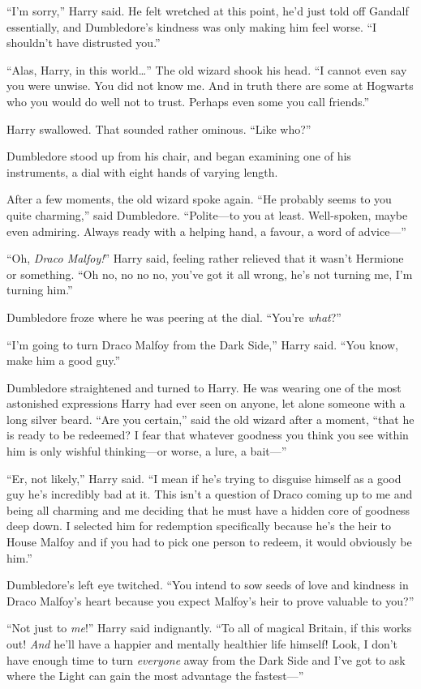 “I’m sorry,” Harry said. He felt wretched at this point, he’d just told off Gandalf essentially, and Dumbledore’s kindness was only making him feel worse.
“I shouldn’t have distrusted you.”

“Alas, Harry, in this world…” The old wizard shook his head.
“I cannot even say you were unwise. You did not know me. And in truth there are some at Hogwarts who you would do well not to trust. Perhaps even some you call friends.”

Harry swallowed. That sounded rather ominous.
“Like who?”

Dumbledore stood up from his chair, and began examining one of his instruments, a dial with eight hands of varying length.

After a few moments, the old wizard spoke again.
“He probably seems to you quite charming,” said Dumbledore.
“Polite—to you at least. Well-spoken, maybe even admiring. Always ready with a helping hand, a favour, a word of advice—”

“Oh, \emph{Draco Malfoy!}” Harry said, feeling rather relieved that it wasn’t Hermione or something.
“Oh no, no no no, you’ve got it all wrong, he’s not turning me, I’m turning him.”

Dumbledore froze where he was peering at the dial.
“You’re \emph{what}?”

“I’m going to turn Draco Malfoy from the Dark Side,” Harry said.
“You know, make him a good guy.”

Dumbledore straightened and turned to Harry. He was wearing one of the most astonished expressions Harry had ever seen on anyone, let alone someone with a long silver beard.
“Are you certain,” said the old wizard after a moment, “that he is ready to be redeemed? I fear that whatever goodness you think you see within him is only wishful thinking—or worse, a lure, a bait—”

“Er, not likely,” Harry said.
“I mean if he’s trying to disguise himself as a good guy he’s incredibly bad at it. This isn’t a question of Draco coming up to me and being all charming and me deciding that he must have a hidden core of goodness deep down. I selected him for redemption specifically because he’s the heir to House Malfoy and if you had to pick one person to redeem, it would obviously be him.”

Dumbledore’s left eye twitched.
“You intend to sow seeds of love and kindness in Draco Malfoy’s heart because you expect Malfoy’s heir to prove valuable to you?”

“Not just to \emph{me}!” Harry said indignantly.
“To all of magical Britain, if this works out! \emph{And} he’ll have a happier and mentally healthier life himself! Look, I don’t have enough time to turn \emph{everyone} away from the Dark Side and I’ve got to ask where the Light can gain the most advantage the fastest—”

